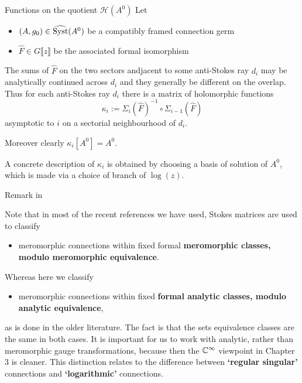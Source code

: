 \begin{frame}{Functions on the quotient $\mathcal{H}(A^0)$}
  Let
  \begin{itemize}
    \item $(A,g_0)\in\widehat{\operatorname{Syst}}(A^0)$ be a compatibly framed connection germ
    \item $\hat F\in G\llbracket z\rrbracket$ be the associated  formal
      isomorphism
  \end{itemize}
  The sums of $\hat F$ on the two sectors andjacent to some anti-Stokes ray
  $d_i$ may be analytically continued across $d_i$ and they generally be
  different on the overlap.
  Thus for each anti-Stokes ray $d_i$ there is a matrix of holomorphic
  functions
  \[
    \kappa_i:=\Sigma_i(\hat F)^{-1}\circ\Sigma_{i-1}(\hat F)
  \]
  asymptotic to $i$ on a sectorial neighbourhood of $d_i$.

  Moreover \textcolor{red!60!black}{clearly} $\kappa_i[A^0]=A^0$.

  A concrete description of $\kappa_i$ is obtained by choosing a basis of
  solution of $A^0$, which is made via a choice of branch of $\log(z)$.
\end{frame}
\begin{frame}{Remark in \cite{thboalch}}
  \begin{rem}
    Note that in most of the recent references we have used, Stokes matrices
    are used to classify
    \begin{itemize}
      \item meromorphic connections within fixed formal \textbf{meromorphic
        classes, modulo meromorphic equivalence}.
    \end{itemize}
    Whereas here we classify
    \begin{itemize}
      \item meromorphic connections within fixed \textbf{formal analytic
        classes, modulo analytic equivalence},
    \end{itemize}
    as is done in the older literature.  The fact is that the sets equivalence
    classes are the same in both cases. It is important for us to work with
    analytic, rather than meromorphic gauge transformations, because then the
    $\mathbb{C}^\infty$ viewpoint in Chapter 3 is cleaner. This distinction relates to
    the difference between \textbf{‘regular singular’} connections and
    \textbf{‘logarithmic’} connections.
  \end{rem}
\end{frame}

